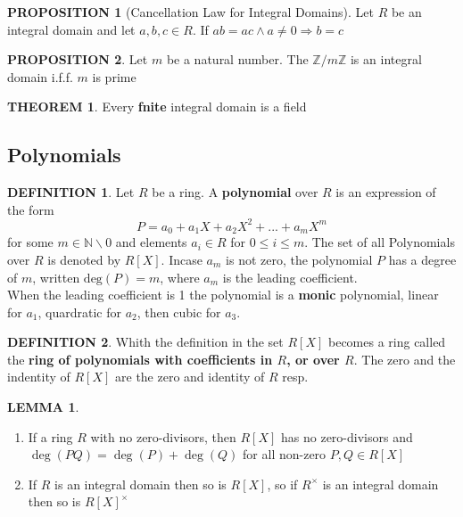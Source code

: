 \documentclass[12pt]{article}
\theoremstyle{definition}
\newtheorem{definition}{DEFINITION}[subsection]
\newtheorem{theorem}{THEOREM}[subsection]
\newtheorem{lemma}{LEMMA}[subsection]
\newtheorem{prop}{PROPOSITION}[subsection]
\begin{document}
\begin{prop}[Cancellation Law for Integral Domains]
    Let $R$ be an integral domain and let $a,b,c \in R$. If $ab = ac \wedge a \neq 0 \Rightarrow b = c$
\end{prop}

\begin{prop}
    Let $m$ be a natural number. The $\mathbb{Z}/m\mathbb{Z}$ is an integral domain i.f.f. $m$ is prime
\end{prop}

\begin{theorem}
    Every \textbf{fnite} integral domain is a field
\end{theorem}


\subsection{Polynomials}
\begin{definition}
    Let $R$ be a ring. A \textbf{polynomial} over $R$ is an expression of the form
    $$P = a_0 + a_1X + a_2X^2 + ... + a_mX^m$$
    for some $m \in \mathbb{N}\backslash 0$ and elements $a_i \in R$ for $0 \leq i \leq m$. The set of all Polynomials over $R$ is denoted by $R[X]$. Incase $a_m$ is not zero, the polynomial $P$ has a degree of $m$, written $\text{deg}(P) = m$, where $a_m$ is the leading coefficient.\\
    When the leading coefficient is 1 the polynomial is a \textbf{monic} polynomial, linear for $a_1$, quardratic for $a_2$, then cubic for $a_3$.
\end{definition}

\begin{definition}
    Whith the definition in the set $R[X]$ becomes a ring called the \textbf{ring of polynomials with coefficients in $R$, or over $R$}. The zero and the indentity of $R[X]$ are the zero and identity of $R$ resp.
\end{definition}

\begin{lemma}
    \quad
    \begin{enumerate}
        \item If a ring $R$ with no zero-divisors, then $R[X]$ has no zero-divisors and $\deg(PQ) = \deg(P) + \deg(Q)$ for all non-zero $P,Q\in R[X]$
        \item If $R$ is an integral domain then so is $R[X]$, so if $R^\times$ is an integral domain then so is $R[X]^\times$
    \end{enumerate}
\end{lemma}
\end{document}
